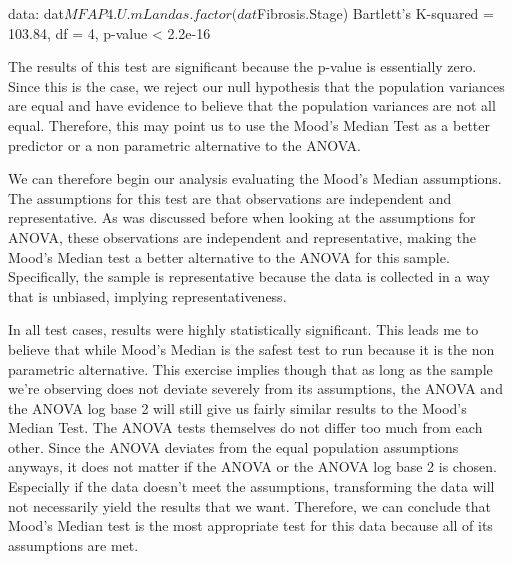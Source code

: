 \documentclass{article}
\begin{document}
\begin{enumerate}
\begin{enumerate}
\begin{Schunk}
\begin{Soutput}
data:  dat$MFAP4.U.mL and as.factor(dat$Fibrosis.Stage)
Bartlett's K-squared = 103.84, df = 4, p-value < 2.2e-16
\end{Soutput}
\end{Schunk}
The results of this test are significant because the p-value is essentially zero. Since this is the case, we reject our null hypothesis that the population variances are equal and have evidence to believe that the population variances are not all equal. Therefore, this may point us to use the Mood's Median Test as a better predictor or a non parametric alternative to the ANOVA. 
\end{enumerate}
We can therefore begin our analysis evaluating the Mood's Median assumptions. The assumptions for this test are that observations are independent and representative. As was discussed before when looking at the assumptions for ANOVA, these observations are independent and representative, making the Mood's Median test a better alternative to the ANOVA for this sample. Specifically, the sample is representative because the data is collected in a way that is unbiased, implying representativeness. 

In all test cases, results were highly statistically significant. This leads me to believe that while Mood's Median is the safest test to run because it is the non parametric alternative. This exercise implies though that as long as the sample we're observing does not deviate severely from its assumptions, the ANOVA and the ANOVA log base 2 will still give us fairly similar results to the Mood's Median Test. The ANOVA tests themselves do not differ too much from each other. Since the ANOVA deviates from the equal population assumptions anyways, it does not matter if the ANOVA or the ANOVA log base 2 is chosen. Especially if the data doesn't meet the assumptions, transforming the data will not necessarily yield the results that we want. Therefore, we can conclude that Mood's Median test is the most appropriate test for this data because all of its assumptions are met. 


\end{enumerate}
\end{document}
